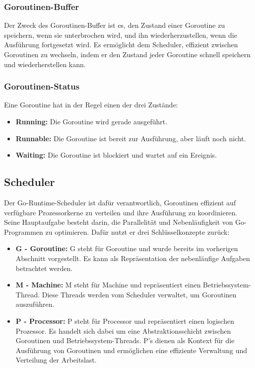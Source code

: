 \documentclass[fontsize=12pt,paper=a4,twoside=semi,parskip=half-,headsepline,headinclude]{scrreprt}
\begin{document}
\subsubsection{Goroutinen-Buffer}
Der Zweck des Goroutinen-Buffer ist es, den Zustand einer Goroutine zu speichern, wenn sie unterbrochen wird, und ihn wiederherzustellen, wenn die Ausführung fortgesetzt wird. Es ermöglicht dem Scheduler, effizient zwischen Goroutinen zu wechseln, indem er den Zustand jeder Goroutine schnell speichern und wiederherstellen kann.
 
\subsubsection{Goroutinen-Status}

Eine Goroutine hat in der Regel einen der drei Zustände:

\begin{itemize}
	\item \textbf{Running:} Die Goroutine wird gerade ausgeführt.
	\item \textbf{Runnable:} Die Goroutine ist bereit zur Ausführung, aber läuft noch nicht.
	\item \textbf{Waiting:} Die Goroutine ist blockiert und wartet auf ein Ereignis.
\end{itemize}	
	
\subsection{Scheduler}

Der Go-Runtime-Scheduler ist dafür verantwortlich, Goroutinen effizient auf verfügbare Prozessorkerne zu verteilen und ihre Ausführung zu koordinieren. Seine Hauptaufgabe besteht darin, die Parallelität und Nebenläufigkeit von Go-Programmen zu optimieren. Dafür nutzt er drei Schlüsselkonzepte zurück:

\begin{itemize}
	\item \textbf{G - Goroutine:} G steht für Goroutine und wurde bereits im vorherigen Abschnitt vorgestellt. Es kann als Repräsentation der nebenläufige Aufgaben betrachtet werden.
	\item \textbf{M - Machine:} M steht für Machine und repräsentiert einen Betriebssystem-Thread. Diese Threads werden vom Scheduler verwaltet, um Goroutinen auszuführen.
	\item \textbf{P - Processor:} P steht für Processor und repräsentiert einen logischen Prozessor. Es handelt sich dabei um eine Abstraktionsschicht zwischen Goroutinen und Betriebssystem-Threads. P's dienen als Kontext für die Ausführung von Goroutinen und ermöglichen eine effiziente Verwaltung und Verteilung der Arbeitslast.
\end{itemize}	
\end{document}
